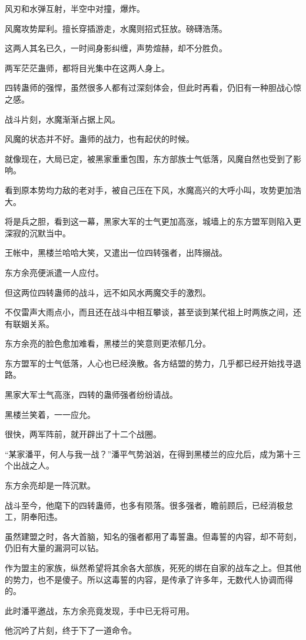 \begin{this_body}
风刃和水弹互射，半空中对撞，爆炸。

风魔攻势犀利。擅长穿插游走，水魔则招式狂放。磅礴浩荡。

这两人其名已久，一时间身影纠缠，声势煊赫，却不分胜负。

两军茫茫蛊师，都将目光集中在这两人身上。

四转蛊师的强悍，虽然很多人都有过深刻体会，但此时再看，仍旧有一种胆战心惊之感。

战斗片刻，水魔渐渐占据上风。

风魔的状态并不好。蛊师的战力，也有起伏的时候。

就像现在，大局已定，被黑家重重包围，东方部族士气低落，风魔自然也受到了影响。

看到原本势均力敌的老对手，被自己压在下风，水魔高兴的大呼小叫，攻势更加浩大。

将是兵之胆，看到这一幕，黑家大军的士气更加高涨，城墙上的东方盟军则陷入更深寂的沉默当中。

王帐中，黑楼兰哈哈大笑，又遣出一位四转强者，出阵搦战。

东方余亮便派遣一人应付。

但这两位四转蛊师的战斗，远不如风水两魔交手的激烈。

不仅雷声大雨点小，而且还在战斗中相互攀谈，甚至谈到某代祖上时两族之间，还有联姻关系。

东方余亮的脸色愈加难看，黑楼兰的笑意则更浓郁几分。

东方盟军的士气低落，人心也已经涣散。各方结盟的势力，几乎都已经开始找寻退路。

黑家大军士气高涨，四转的蛊师强者纷纷请战。

黑楼兰笑着，一一应允。

很快，两军阵前，就开辟出了十二个战圈。

“某家潘平，何人与我一战？”潘平气势汹汹，在得到黑楼兰的应允后，成为第十三个出战之人。

东方余亮却是一阵沉默。

战斗至今，他麾下的四转蛊师，也多有陨落。很多强者，瞻前顾后，已经消极怠工，阴奉阳违。

虽然建盟之时，各大首脑，知名的强者都用了毒誓蛊。但毒誓的内容，却不苛刻，仍旧有大量的漏洞可以钻。

作为盟主的家族，纵然希望将其余各大部族，死死的绑在自家的战车之上。但其他的势力，也不是傻子。所以这毒誓的内容，是传承了许多年，无数代人协调而得的。

此时潘平邀战，东方余亮竟发现，手中已无将可用。

他沉吟了片刻，终于下了一道命令。


\end{this_body}
